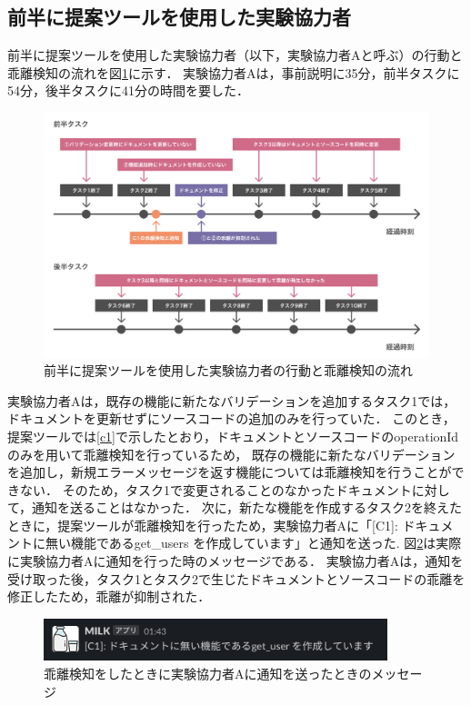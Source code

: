 \subsection{前半に提案ツールを使用した実験協力者}
前半に提案ツールを使用した実験協力者（以下，実験協力者Aと呼ぶ）の行動と乖離検知の流れを図\ref{usera}に示す．
実験協力者Aは，事前説明に35分，前半タスクに54分，後半タスクに41分の時間を要した．
\begin{figure}[H]
    \centering
    \includegraphics[width=14cm]{images/usera.png}
    \caption{前半に提案ツールを使用した実験協力者の行動と乖離検知の流れ}
    \label{usera}
\end{figure}

実験協力者Aは，既存の機能に新たなバリデーションを追加するタスク1では，ドキュメントを更新せずにソースコードの追加のみを行っていた．
このとき，提案ツールでは\ref{c1}で示したとおり，ドキュメントとソースコードのoperationIdのみを用いて乖離検知を行っているため，
既存の機能に新たなバリデーションを追加し，新規エラーメッセージを返す機能については乖離検知を行うことができない．
そのため，タスク1で変更されることのなかったドキュメントに対して，通知を送ることはなかった．
次に，新たな機能を作成するタスク2を終えたときに，提案ツールが乖離検知を行ったため，実験協力者Aに「[C1]: ドキュメントに無い機能であるget\_users を作成しています」と通知を送った.
図\ref{notification1}は実際に実験協力者Aに通知を行った時のメッセージである．
実験協力者Aは，通知を受け取った後，タスク1とタスク2で生じたドキュメントとソースコードの乖離を修正したため，乖離が抑制された．

\begin{figure}[H]
    \centering
    \includegraphics[width=10cm]{images/notification1.png}
    \caption{乖離検知をしたときに実験協力者Aに通知を送ったときのメッセージ}
    \label{notification1}
\end{figure}

